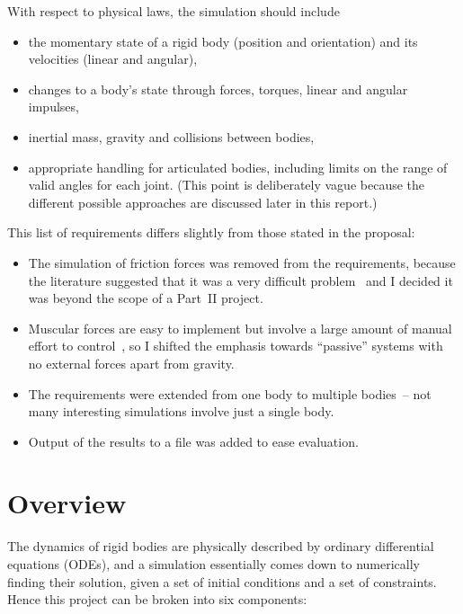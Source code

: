 With respect to physical laws, the simulation should include
\begin{itemize}
\item the momentary state of a rigid body (position and orientation) and its velocities (linear
    and angular),
\item changes to a body's state through forces, torques, linear and angular impulses,
\item inertial mass, gravity and collisions between bodies,
\item appropriate handling for articulated bodies, including limits on the range of valid angles
    for each joint. (This point is deliberately vague because the different possible approaches
    are discussed later in this report.)
\end{itemize}

This list of requirements differs slightly from those stated in the proposal:
\begin{itemize}
\item The simulation of friction forces was removed from the requirements, because the literature
    suggested that it was a very difficult problem~\cite{Baraff:PhD} and I decided it was beyond
    the scope of a Part~II project.
\item Muscular forces are easy to implement but involve a large amount of manual effort to
    control~\cite{Green:91}, so I shifted the emphasis towards ``passive'' systems with no
    external forces apart from gravity.
\item The requirements were extended from one body to multiple bodies~-- not many interesting
    simulations involve just a single body.
\item Output of the results to a file was added to ease evaluation.
\end{itemize}

\section{Overview\label{introOverview}}

The dynamics of rigid bodies are physically described by ordinary differential equations (ODEs),
and a simulation essentially comes down to numerically finding their solution, given a set of
initial conditions and a set of constraints. Hence this project can be broken into six components:

